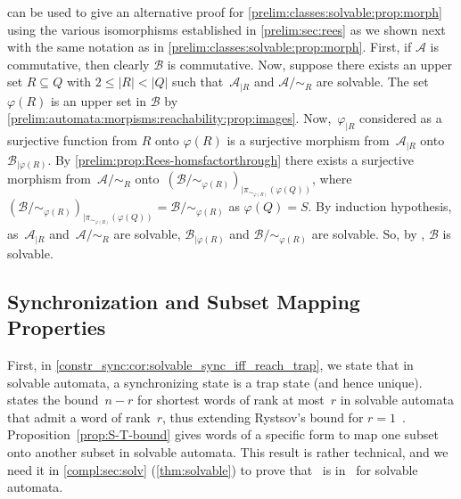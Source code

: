 \begin{remark}
	can be used to give an alternative proof
	for \cref{prelim:classes:solvable:prop:morph}
	using the various isomorphisms established in \cref{prelim:sec:rees}
	as we shown next with the same notation as in \cref{prelim:classes:solvable:prop:morph}.
	First, if $\mathcal A$ is commutative,
	then clearly $\mathcal B$ is commutative.
	Now, suppose
	there exists an upper set $R \subseteq Q$
	with $2 \le |R| < |Q|$
	such that~$\mathcal A_{|R}$
	and $\mathcal A / {\sim_R}$ are solvable.
	The set $\varphi(R)$ is an upper set in $\mathcal B$ by \cref{prelim:automata:morpisms:reachability:prop:images}.
	Now,~$\varphi_{|R}$ considered as a surjective function from $R$ onto $\varphi(R)$
	is a surjective morphism from~$\mathcal A_{|R}$ onto~$\mathcal B_{|\varphi(R)}$.
	By \cref{prelim:prop:Rees-homsfactorthrough}
	there exists a surjective morphism
	from~$\mathcal A / {\sim_R}$ onto~$( \mathcal B / {\sim_{\varphi(R)}} )_{|\pi_{\sim_{\varphi(R)}}(\varphi(Q))}$,
	where $( \mathcal B / {\sim_{\varphi(R)}} )_{|\pi_{\sim_{\varphi(R)}}(\varphi(Q))} = \mathcal B / {\sim_{\varphi(R)}}$
	as $\varphi(Q) = S$.
	By induction hypothesis, 
	as~$\mathcal A_{|R}$ and~$\mathcal A / {\sim_R}$ are solvable,
	$\mathcal B_{|\varphi(R)}$
	and $\mathcal B / {\sim_{\varphi(R)}}$ are solvable.
	So, by ,
	$\mathcal B$ is solvable.
\end{remark}

\subsection{Synchronization and Subset Mapping Properties}
\label{prelim:classes:sec:solvable:sync}

First, in \cref{constr_sync:cor:solvable_sync_iff_reach_trap},
we state that in solvable automata, a synchronizing state is a trap state (and hence unique).
 states the bound~$n - r$
for shortest words of rank at most~$r$ in solvable automata that admit a word of rank~$r$,
thus extending Rystsov's bound for $r = 1$~\cite[Cor.~4.2]{Rystsov97}.
Proposition~\ref{prop:S-T-bound}
gives words of a specific form to map
one subset onto another subset
in solvable automata. This result is rather technical, and we need it
in \cref{compl:sec:solv} (\cref{thm:solvable}) to prove that \ST\ 
is in \NP\ for solvable automata.

